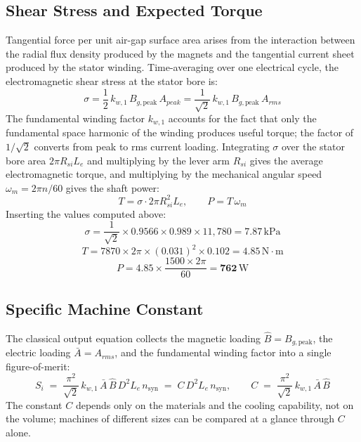 \documentclass[12pt,a4paper]{article}
\newcommand{\unit}[1]{\ensuremath{\,\mathrm{#1}}}
\begin{document}
\subsection{Shear Stress and Expected Torque}

Tangential force per unit air-gap surface area arises from the
interaction between the radial flux density produced by the magnets and
the tangential current sheet produced by the stator winding.
Time-averaging over one electrical cycle, the electromagnetic shear
stress at the stator bore is:
\begin{equation}
  \sigma = \frac{1}{2}\,k_{w,1}\,B_{g,\text{peak}}\,A_{peak}
         = \frac{1}{\sqrt{2}}\,k_{w,1}\,B_{g,\text{peak}}\,A_{rms}
  \label{eq:sigma}
\end{equation}
The fundamental winding factor $k_{w,1}$ accounts for the fact that only
the fundamental space harmonic of the winding produces useful torque;
the factor of $1/\sqrt{2}$ converts from peak to rms current loading.
Integrating $\sigma$ over the stator bore area $2\pi R_{si} L_e$ and
multiplying by the lever arm $R_{si}$ gives the average electromagnetic
torque, and multiplying by the mechanical angular speed
$\omega_m = 2\pi n/60$ gives the shaft power:
\begin{equation}
  T = \sigma \cdot 2\pi R_{si}^2 L_e,
  \qquad
  P = T\,\omega_m
  \label{eq:T}
\end{equation}
Inserting the values computed above:
\begin{equation}
  \sigma = \frac{1}{\sqrt{2}} \times 0.9566 \times 0.989 \times 11{,}780
         = \mathbf{7.87\unit{kPa}}
\end{equation}
\begin{equation}
  T = 7870 \times 2\pi \times (0.031)^2 \times 0.102
    = \mathbf{4.85\unit{N \cdot m}}
\end{equation}
\begin{equation}
  P = 4.85 \times \frac{1500 \times 2\pi}{60} = \mathbf{762\unit{W}}
\end{equation}


\subsection{Specific Machine Constant}

The classical output equation collects the magnetic loading
$\hat{B} = B_{g,\text{peak}}$, the electric loading $\bar A = A_{rms}$,
and the fundamental winding factor into a single figure-of-merit:
\begin{equation}
  S_i \;=\; \frac{\pi^2}{\sqrt{2}}\,k_{w,1}\,\bar A\,\hat{B}\,D^2 L_e\,n_{\text{syn}}
       \;=\; C\,D^2 L_e\,n_{\text{syn}},
  \qquad
  C \;=\; \frac{\pi^2}{\sqrt{2}}\,k_{w,1}\,\bar A\,\hat{B}
  \label{eq:Cspec}
\end{equation}
The constant $C$ depends only on the materials and the cooling
capability, not on the volume; machines of different sizes can be
compared at a glance through $C$ alone.
\end{document}
